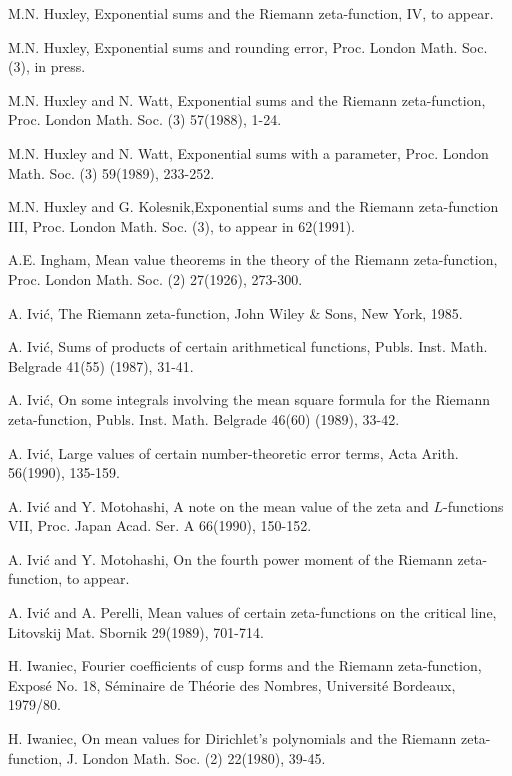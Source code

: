 \begin{thebibliography}{99}
 M.N. Huxley, Exponential sums and the Riemann zeta-function, IV, to appear.

 M.N. Huxley, Exponential sums and rounding error, Proc. London Math. Soc. (3), in press.

 M.N. Huxley and N. Watt, Exponential sums and the Riemann zeta-function, Proc. London Math. Soc. (3) 57(1988), 1-24.

 M.N. Huxley and N. Watt, Exponential sums with a parameter, Proc. London Math. Soc. (3) 59(1989), 233-252.

 M.N. Huxley and G. Kolesnik,\pageoriginale Exponential sums and the Riemann zeta-function III, Proc. London Math. Soc. (3), to appear in 62(1991).

 A.E. Ingham, Mean value theorems in the theory of the Riemann zeta-function, Proc. London Math. Soc. (2) 27(1926), 273-300.

 A. Ivi\'c, The Riemann zeta-function, John Wiley \& Sons, New York, 1985.

 A. Ivi\'c, Sums of products of certain arithmetical functions, Publs. Inst. Math. Belgrade 41(55) (1987), 31-41.

 A. Ivi\'c, On some integrals involving the mean square formula for the Riemann zeta-function, Publs. Inst. Math. Belgrade 46(60) (1989), 33-42.

 A. Ivi\'c, Large values of certain number-theoretic error terms, Acta Arith. 56(1990), 135-159.

 A. Ivi\'c and Y. Motohashi, A note on the mean value of the zeta and $L$-functions VII, Proc. Japan Acad. Ser. A 66(1990), 150-152.

 A. Ivi\'c and Y. Motohashi, On the fourth power moment of the Riemann zeta-function, to appear.

 A. Ivi\'c and A. Perelli, Mean values of certain zeta-functions on the critical line, Litovskij Mat. Sbornik 29(1989), 701-714.

 H. Iwaniec, Fourier coefficients of cusp forms and the Riemann zeta-function, Expos\'e No. 18, S\'eminaire de Th\'eorie des Nombres, Universit\'e Bordeaux, 1979/80.

 H. Iwaniec, On mean values for Dirichlet's polynomials and the Riemann zeta-function, J. London Math. Soc. (2) 22(1980), 39-45.


\end{thebibliography}
